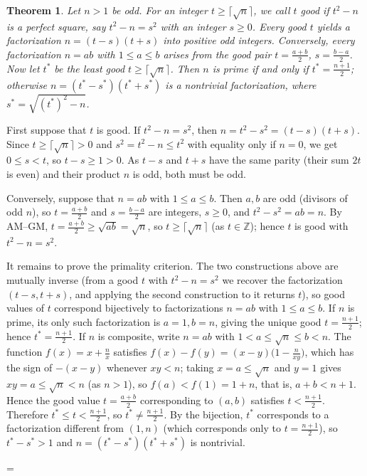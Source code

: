 \documentclass[11pt]{article}
\makeatletter
\theoremstyle{ntstyle}
\newtheorem{theorem}{Theorem}[subsection]
\let\nt@closedisplay\]
\def\nt@guardedclose{\@ifnextchar\par{\nt@closeafterpar}{\@ifnextchar\end{\postdisplaypenalty\@M\nt@closedisplay}{\nt@closedisplay}}}
\def\nt@closeafterpar\par{\@ifnextchar\par{\nt@closeafterpar}{\@ifnextchar\end{\postdisplaypenalty\@M\nt@closedisplay\par}{\nt@closedisplay\par}}}
\renewenvironment{proof}[1][\proofname]{\par
  \pushQED{\qed}\normalfont\topsep\medskipamount\edef\nt@afterproof{\@endparpenalty=\the\@endparpenalty\relax}\@beginparpenalty\@M\@endparpenalty\@M\let\]\nt@guardedclose\trivlist\item[]\textit{#1\@addpunct{.}} \ignorespaces}{\ifvmode\addpenalty\@M\fi\popQED\nt@afterproof\endtrivlist\@endpefalse}
\makeatother
\begin{document}
\begin{theorem}\label{thm:9.5.1} Let $n>1$ be odd. For an integer $t \ge \lceil\sqrt
		{n}\rceil$, we call $t$ good if $t^2-n$ is a perfect square, say
	$t^2 - n = s^2$ with an integer $s \ge 0$. Every good $t$ yields a factorization
	$n = (t-s)(t+s)$ into positive odd integers. Conversely, every
	factorization $n = ab$ with $1 \le a \le b$ arises from the good pair
	$t = \frac{a+b}{2}$, $s = \frac{b-a}{2}$. Now let
	$t^{*}$ be the least good $t \ge \lceil\sqrt{n}\rceil$. Then $n$ is prime
	if and only if $t^{*} = \frac{n+1}{2}$; otherwise $n =
		(t^{*}-s^{*})(t^{*}+s^{*})$ is a nontrivial factorization, where
	$s^{*} = \sqrt{(t^{*})^2-n}$.

\end{theorem}

\begin{proof} First suppose that $t$ is good. If $t^2-n=s^2$, then
	$n=t^2-s^2=(t-s)(t+s)$. Since $t\ge\lceil\sqrt
		{n}\rceil>0$ and $s^2=t^2-n\le t^2$ with equality only if $n=0$, we get
	$0\le s<t$, so $t-s\ge1>0$. As $t-s$ and $t+s$ have the same parity
	(their sum $2t$ is even) and their product $n$ is odd, both must be odd.

	Conversely, suppose that $n=ab$ with $1\le a\le b$. Then
	$a,b$ are odd (divisors of odd $n$), so $t=\frac{a+b}{2}$ and
	$s=\frac{b-a}{2}$ are integers, $s\ge0$, and $t^2-s^2=ab=n$. By AM--GM,
	$t=\frac{a+b}{2}\ge\sqrt{ab}=\sqrt{n}$, so $t\ge\lceil\sqrt{n}\rceil$ (as
	$t\in\mathbb{Z}$); hence $t$ is good with $t^2-n=s^2$.

	It remains to prove the primality criterion. The two constructions above are mutually
	inverse (from a good $t$ with $t^2-n=s^2$ we recover the
	factorization $(t-s,t+s)$, and applying the second construction to it
	returns $t$), so good values of $t$ correspond bijectively to
	factorizations $n=ab$ with $1\le a\le b$. If $n$ is prime, its only
	such factorization is $a=1,b=n$, giving the unique good
	$t=\frac{n+1}{2}$; hence $t^*=\frac{n+1}{2}$. If $n$ is composite,
	write $n=ab$ with $1<a\le\sqrt{n}\le b<n$. The function $f(x)=x+\frac{n}{x}$ satisfies $f(x)-f(y)=(x-y)\big(1-\frac{n}{xy}\big)$, which has
	the sign of $-(x-y)$ whenever $xy<n$; taking $x=a\le\sqrt{n}$ and
	$y=1$ gives $xy=a\le\sqrt{n}<n$ (as $n>1$), so $f(a)<f(1)=1+n$, that is, $a+b<n+1$. Hence the good value $t=\frac{a+b}{2}$ corresponding to $(a,b)$
	satisfies $t<\frac{n+1}{2}$. Therefore $t^*\le t<\frac{n+1}{2}$, so
	$t^*\neq\frac{n+1}{2}$. By the bijection, $t^*$ corresponds to a
	factorization different from $(1,n)$ (which corresponds only to
	$t=\frac{n+1}{2}$), so $t^*-s^*>1$ and $n=(t^*-s^*)(t^*+s^*)$ is
	nontrivial.

\end{proof}
\end{document}
